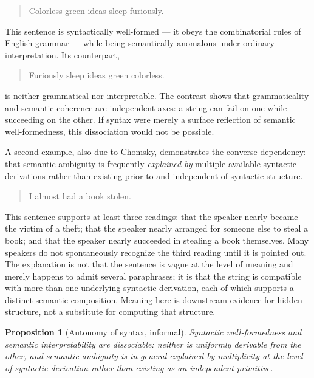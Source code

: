 \documentclass[11pt]{book}
\theoremstyle{plain}
\newtheorem{proposition}[theorem]{Proposition}
\theoremstyle{definition}
\theoremstyle{remark}
\begin{document}
\begin{quote}
Colorless green ideas sleep furiously.
\end{quote}

\noindent This sentence is syntactically well-formed --- it obeys the
combinatorial rules of English grammar --- while being semantically
anomalous under ordinary interpretation. Its counterpart,

\begin{quote}
Furiously sleep ideas green colorless.
\end{quote}

\noindent is neither grammatical nor interpretable. The contrast shows
that grammaticality and semantic coherence are independent axes: a
string can fail on one while succeeding on the other. If syntax were
merely a surface reflection of semantic well-formedness, this
dissociation would not be possible.

A second example, also due to Chomsky, demonstrates the converse
dependency: that semantic ambiguity is frequently \emph{explained by}
multiple available syntactic derivations rather than existing prior to
and independent of syntactic structure.

\begin{quote}
I almost had a book stolen.
\end{quote}

\noindent This sentence supports at least three readings: that the
speaker nearly became the victim of a theft; that the speaker nearly
arranged for someone else to steal a book; and that the speaker nearly
succeeded in stealing a book themselves. Many speakers do not
spontaneously recognize the third reading until it is pointed out. The
explanation is not that the sentence is vague at the level of meaning
and merely happens to admit several paraphrases; it is that the string
is compatible with more than one underlying syntactic derivation, each
of which supports a distinct semantic composition. Meaning here is
downstream evidence for hidden structure, not a substitute for
computing that structure.

\begin{proposition}[Autonomy of syntax, informal]
\label{prop:autonomy}
Syntactic well-formedness and semantic interpretability are
dissociable: neither is uniformly derivable from the other, and
semantic ambiguity is in general explained by multiplicity at the
level of syntactic derivation rather than existing as an independent
primitive.
\end{proposition}
\end{document}
